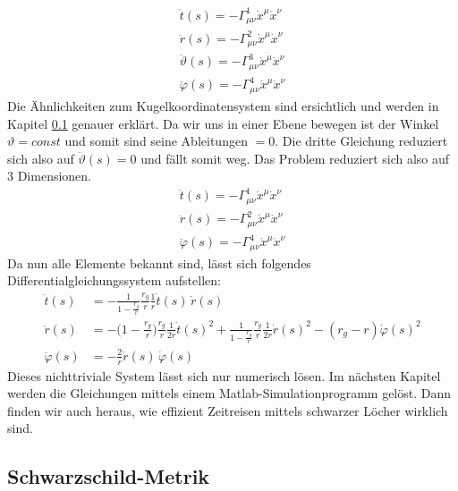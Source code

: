 \begin{refsection}
\begin{align*}
	\ddot{t}(s) = -\Gamma^{1}_{\mu\nu}\dot{x}^{\mu}\dot{x}^{\nu}\\
	\ddot{r}(s) = -\Gamma^{2}_{\mu\nu}\dot{x}^{\mu}\dot{x}^{\nu}\\
	\ddot{\vartheta}(s) = -\Gamma^{3}_{\mu\nu}\dot{x}^{\mu}\dot{x}^{\nu}\\
	\ddot{\varphi}(s) = -\Gamma^{4}_{\mu\nu}\dot{x}^{\mu}\dot{x}^{\nu}		
	\end{align*}
	Die Ähnlichkeiten zum Kugelkoordinatensystem sind ersichtlich und werden in Kapitel \ref{Schwarzschild-Metrik} genauer erklärt.
	Da wir uns in einer Ebene bewegen ist der Winkel$\vartheta = const$ und somit sind seine Ableitungen $=0$. Die dritte Gleichung reduziert sich also auf $\ddot{\vartheta}(s)=0$ und fällt somit weg. Das Problem reduziert sich also auf 3 Dimensionen.
	\begin{align*}
	\ddot{t}(s) = -\Gamma^{1}_{\mu\nu}\dot{x}^{\mu}\dot{x}^{\nu}\\
	\ddot{r}(s) = -\Gamma^{2}_{\mu\nu}\dot{x}^{\mu}\dot{x}^{\nu}\\
	\ddot{\varphi}(s) = -\Gamma^{4}_{\mu\nu}\dot{x}^{\mu}\dot{x}^{\nu}		
	\end{align*}
	Da nun alle Elemente bekannt sind, lässt sich folgendes Differentialgleichungssystem aufstellen:
	\begin{equation}
	\begin{aligned}
	\ddot t(s)
	&=
	-\frac{1}{1-\displaystyle\frac{r_g}{r}}\frac{r_g}{r}\frac{1}{r}\dot t(s)\,\dot r(s)
	\\
	\ddot r(s)
	&=
	-\biggl(1-\frac{r_g}{r}\biggr)\frac{r_g}{r}\frac1{2r}\dot t(s)^2
	+\frac{1}{1-\displaystyle\frac{r_g}{r}} \frac{r_g}{r}\frac1{2r}\dot r(s)^2
	- (r_g-r) \dot\varphi(s)^2
	\\
	\ddot \varphi(s)
	&=
	-\frac2r \dot r(s)\,\dot\varphi(s)
	\end{aligned}
	\end{equation}\label{finaleq}
	Dieses nichttriviale System lässt sich nur numerisch lösen. Im nächsten Kapitel werden die Gleichungen mittels einem Matlab-Simulationprogramm gelöst. Dann finden wir auch heraus, wie effizient Zeitreisen mittels schwarzer Löcher wirklich sind.
	
	\subsection{Schwarzschild-Metrik}\label{Schwarzschild-Metrik}
	

\end{refsection}
